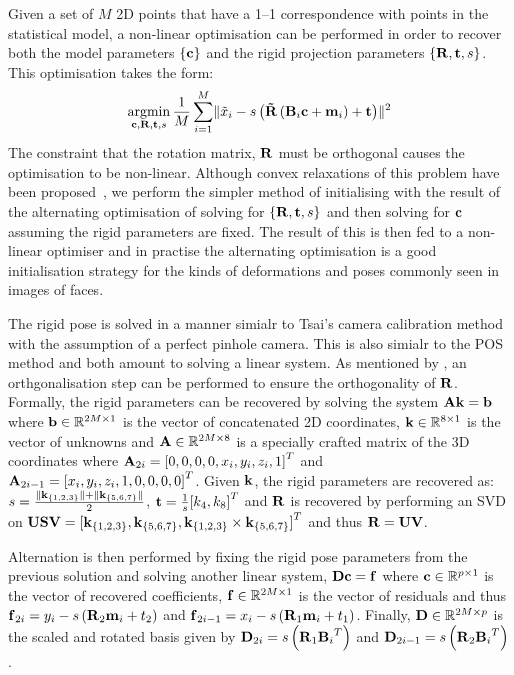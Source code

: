 Given a set of $M$ 2D points that have a 1--1 correspondence with points in the
statistical model, a non-linear optimisation can be performed in order to
recover both the model parameters $\{\boldsymbol{\mathbf{c}}\}$ and the rigid projection parameters
$\{\boldsymbol{\mathbf{R}}, \boldsymbol{\mathbf{t}}, s\}$. This optimisation takes the form:
\begin{equation}
\argmin_{\bb{c}, \bb{R}, \bb{t}, s} \frac{1}{M} \sum_{i=1}^M \lVert \tilde{x}_i - s \left( \bb{\tilde{R}} \left(\bb{B}_i \bb{c} + \bb{m}_i\right) + \bb{t} \right) \rVert^2
\end{equation}
The constraint that the rotation matrix, $\boldsymbol{\mathbf{R}}$ must be orthogonal causes
the optimisation to be non-linear. Although convex relaxations of this problem
have been proposed~\cite{zhou20153d}, we perform the simpler method of
initialising with the result of the alternating optimisation of solving for
$\{\boldsymbol{\mathbf{R}}, \boldsymbol{\mathbf{t}}, s\}$ and then solving for $\boldsymbol{\mathbf{c}}$ assuming the rigid parameters
are fixed. The result of this is then fed to a non-linear optimiser and in practise
the alternating optimisation is a good initialisation strategy for the kinds
of deformations and poses commonly seen in images of faces.

The rigid pose is solved in a manner simialr to Tsai's camera
calibration method~\cite{tsai1987versatile} with the assumption of a perfect
pinhole camera. This is also simialr to the POS~\cite{dementhon1995model}
method and both amount to solving a linear system. 
As mentioned by \citet{bas2016fitting}, an orthgonalisation step can be 
performed to ensure the orthogonality of $\boldsymbol{\mathbf{R}}$.
Formally, the rigid parameters can be recovered by solving the system
$\boldsymbol{\mathbf{A}}\boldsymbol{\mathbf{k}} = \boldsymbol{\mathbf{b}}$ where $\boldsymbol{\mathbf{b}} \in \mathbb{R}^{2M \times 1}$ is the vector
of concatenated 2D coordinates, $\boldsymbol{\mathbf{k}} \in \mathbb{R}^{8 \times 1}$ is the vector of
unknowns and $\boldsymbol{\mathbf{A}} \in \mathbb{R}^{2M \times 8}$ is a specially crafted matrix
of the 3D coordinates where $\boldsymbol{\mathbf{A}}_{2i} = {[0, 0, 0, 0, x_i, y_i, z_i, 1]}^T$ and
$\boldsymbol{\mathbf{A}}_{2i -1} = {[x_i, y_i, z_i, 1, 0, 0, 0, 0]}^T$. Given $\boldsymbol{\mathbf{k}}$, the rigid
parameters are recovered as:
$s = \frac{\lVert{} \boldsymbol{\mathbf{k}}_{\{1,2,3\}} \rVert + \lVert{} \boldsymbol{\mathbf{k}}_{\{5,6,7\}} \rVert}{2}$, $\boldsymbol{\mathbf{t}} = \frac{1}{s} {[k_4, k_8]}^T$
and $\boldsymbol{\mathbf{R}}$ is recovered by performing an SVD on
$\boldsymbol{\mathbf{U}}\boldsymbol{\mathbf{S}}\boldsymbol{\mathbf{V}} = {[\boldsymbol{\mathbf{k}}_{\{1,2,3\}}, \boldsymbol{\mathbf{k}}_{\{5,6,7\}}, \boldsymbol{\mathbf{k}}_{\{1,2,3\}} \times \boldsymbol{\mathbf{k}}_{\{5,6,7\}}]}^T$
and thus $\boldsymbol{\mathbf{R}} = \boldsymbol{\mathbf{U}}\boldsymbol{\mathbf{V}}$.

Alternation is then performed by fixing the rigid pose parameters from the previous
solution and solving another linear system, $\boldsymbol{\mathbf{D}}\boldsymbol{\mathbf{c}} = \boldsymbol{\mathbf{f}}$ where
$\boldsymbol{\mathbf{c}} \in \mathbb{R}^{p \times 1}$ is the vector of recovered coefficients,
$\boldsymbol{\mathbf{f}} \in \mathbb{R}^{2M \times 1}$ is the vector of residuals and thus
$\boldsymbol{\mathbf{f}}_{2i} = y_i - s \left(\boldsymbol{\mathbf{R}}_2 \boldsymbol{\mathbf{m}}_i + t_2 \right)$ and
$\boldsymbol{\mathbf{f}}_{2i - 1} = x_i - s \left(\boldsymbol{\mathbf{R}}_1 \boldsymbol{\mathbf{m}}_i + t_1 \right)$. Finally,
$\boldsymbol{\mathbf{D}} \in \mathbb{R}^{2M \times p}$ is the scaled and rotated basis given by
$\boldsymbol{\mathbf{D}}_{2i} = s \left( \boldsymbol{\mathbf{R}}_1 {\boldsymbol{\mathbf{B}}_i}^T \right)$ and 
$\boldsymbol{\mathbf{D}}_{2i - 1} = s \left( \boldsymbol{\mathbf{R}}_2 {\boldsymbol{\mathbf{B}}_i}^T \right)$.
